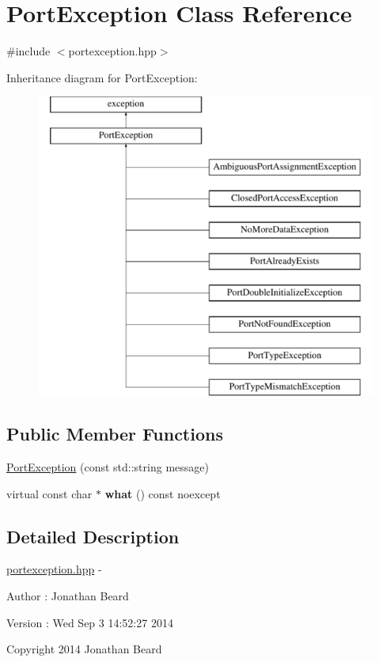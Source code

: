 \hypertarget{class_port_exception}{}\section{Port\+Exception Class Reference}
\label{class_port_exception}


{\ttfamily \#include $<$portexception.\+hpp$>$}

Inheritance diagram for Port\+Exception\+:\begin{figure}[H]
\begin{center}
\leavevmode
\includegraphics[height=10.000000cm]{class_port_exception}
\end{center}
\end{figure}
\subsection*{Public Member Functions}
\begin{DoxyCompactItemize}
\item 
\hyperlink{class_port_exception_aec6ea14772ec4e06739ca2ae87115cbf}{Port\+Exception} (const std\+::string message)
\item 
\hypertarget{class_port_exception_ae500d53d31e07f1d7c5c4a3be1458eef}{}virtual const char $\ast$ {\bfseries what} () const  noexcept\label{class_port_exception_ae500d53d31e07f1d7c5c4a3be1458eef}

\end{DoxyCompactItemize}


\subsection{Detailed Description}
\hyperlink{portexception_8hpp_source}{portexception.\+hpp} -\/ \begin{DoxyAuthor}{Author}
\+: Jonathan Beard 
\end{DoxyAuthor}
\begin{DoxyVersion}{Version}
\+: Wed Sep 3 14\+:52\+:27 2014
\end{DoxyVersion}
Copyright 2014 Jonathan Beard

